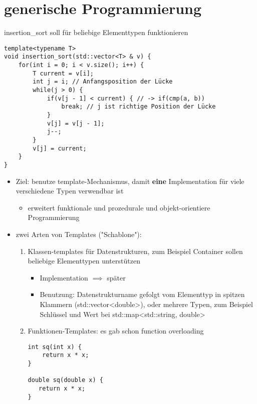 \documentclass[a4paper]{scrartcl}
\theoremstyle{definition}
\theoremstyle{plain}
\theoremstyle{remark}
\theoremstyle{remark}
\begin{document}
\section{generische Programmierung}
\label{sec-14}
insertion\_sort soll für beliebige Elementtypen funktionieren
\begin{verbatim}
template<typename T>
void insertion_sort(std::vector<T> & v) {
	for(int i = 0; i < v.size(); i++) {
		T current = v[i];
		int j = i; // Anfangsposition der Lücke
		while(j > 0) {
			if(v[j - 1] < current) { // -> if(cmp(a, b))
				break; // j ist richtige Position der Lücke
			}
			v[j] = v[j - 1];
			j--;
		}
		v[j] = current;
	}
}
\end{verbatim}
\begin{itemize}
\item Ziel: benutze template-Mechanismus, damit \textbf{eine} Implementation für viele verschiedene Typen verwendbar ist
\begin{itemize}
\item erweitert funktionale und prozedurale und objekt-orientiere Programmierung
\end{itemize}
\item zwei Arten von Templates ("Schablone"):
\begin{enumerate}
\item Klassen-templates für Datenstrukturen, zum Beispiel Container sollen beliebige Elementtypen unterstützen
\begin{itemize}
\item Implementation $\implies$ später
\item Benutzung: Datenstrukturname gefolgt vom Elementtyp in spitzen Klammern (std::vector<double>), oder mehrere Typen, zum Beispiel Schlüssel und Wert bei std::map<std::string, double>
\end{itemize}
\item Funktionen-Templates: es gab schon function overloading
\begin{verbatim}
int sq(int x) {
	return x * x;
}

double sq(double x) {
   return x * x;
}


\end{verbatim}
\end{enumerate}
\end{itemize}
\end{document}
